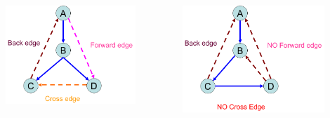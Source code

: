 \begin{frame}
  \begin{columns}
      \includegraphics[width = 0.80\textwidth]{figs/dfs-digraph.png}

      \vspace{0.50cm}
      \centerline{}
    \pause
      \includegraphics[width = 0.80\textwidth]{figs/dfs-undirected.png}

      \vspace{0.50cm}
      \centerline{}
  \end{columns}
\end{frame}

